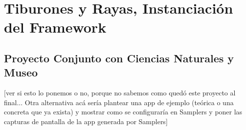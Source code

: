\chapter{Tiburones y Rayas, Instanciación del Framework}

\section{Proyecto Conjunto con Ciencias Naturales y Museo}
[ver si esto lo ponemos o no, porque no sabemos como quedó este proyecto al final... Otra alternativa acá sería plantear una app de ejemplo (teórica o una concreta que ya exista) y mostrar como se configuraría en Samplers y poner las capturas de pantalla de la app generada por Samplers]
